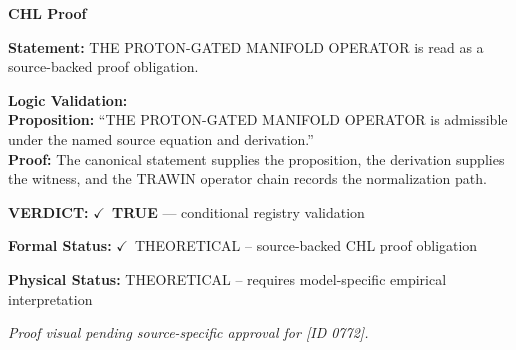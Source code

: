 \vspace{0.45em}
\noindent\textbf{CHL Proof}\par
\textbf{Statement:} THE PROTON-GATED MANIFOLD OPERATOR is read as a source-backed proof obligation.

\textbf{Logic Validation:}\\
\textbf{Proposition:} ``THE PROTON-GATED MANIFOLD OPERATOR is admissible under the named source equation and derivation.''\\
\textbf{Proof:} The canonical statement supplies the proposition, the derivation supplies the witness, and the TRAWIN operator chain records the normalization path.

\textbf{VERDICT:} \ensuremath{\checkmark}\ \textbf{TRUE} --- conditional registry validation

\textbf{Formal Status:} \ensuremath{\checkmark}\ THEORETICAL -- source-backed CHL proof obligation

\textbf{Physical Status:} THEORETICAL -- requires model-specific empirical interpretation
\par\vspace{0.45em}
\par
\vfill
\begingroup\footnotesize\itshape
Proof visual pending source-specific approval for [ID 0772].
\par\endgroup
\vfill
\endgroup
\endgroup
